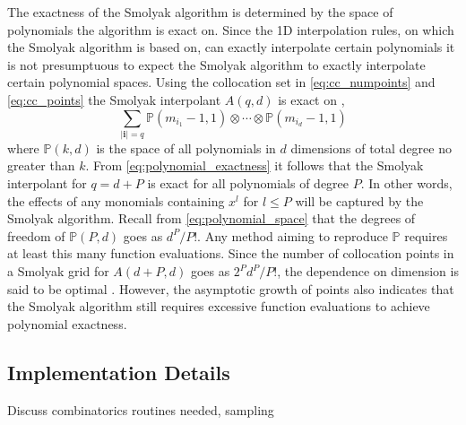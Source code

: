 The exactness of the Smolyak algorithm is determined by the space of polynomials the algorithm is exact on. Since the 1D interpolation rules, on which the Smolyak algorithm is based on, can exactly interpolate certain polynomials it is not presumptuous to expect the Smolyak algorithm to exactly interpolate certain polynomial spaces. Using the collocation set in \ref{eq:cc_numpoints} and \ref{eq:cc_points} the Smolyak interpolant $A(q,d)$ is exact on \cite{NovakRitter},
\begin{equation} \label{eq:polynomial_exactness}
    \sum_{\vert\textbf{i}\vert = q}
     \mathbb{P}(m_{i_1}-1,1)\otimes\cdots\otimes
      \mathbb{P}(m_{i_d}-1,1)
\end{equation} 
where $\mathbb{P}(k,d)$ is the space of all polynomials in $d$ dimensions of total degree no greater than $k$. From \ref{eq:polynomial_exactness} it follows that the Smolyak interpolant for $q=d+P$ is exact for all polynomials of degree $P$. In other words, the effects of any monomials containing $x^l$ for $l\leq P$ will be captured by the Smolyak algorithm. Recall from \ref{eq:polynomial_space} that the degrees of freedom of $\mathbb{P}(P,d)$ goes as $d^P/P!$. Any method aiming to reproduce $\mathbb{P}$ requires at least this many function evaluations. Since the number of collocation points in a Smolyak grid for $A(d+P,d)$ goes as $2^{P}d^{P}/P!$, the dependence on dimension is said to be optimal \cite{NovakRitter}. However, the asymptotic growth of points also indicates that the Smolyak algorithm still requires excessive function evaluations to achieve polynomial exactness.     


\subsection{Implementation Details} \label{subsec:implement_details}
Discuss combinatorics routines needed, sampling

  